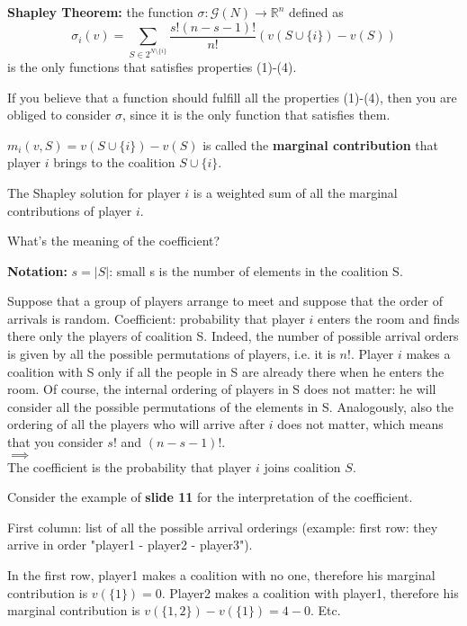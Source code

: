 \bigskip
\noindent \textbf{Shapley Theorem:} the function $\sigma: \mathcal{G}(N) \rightarrow \mathbb{R}^n$ defined as
\[
	\sigma_i(v) = \sum_{S \in 2^{N \setminus \{i\}}}{\frac{s!(n-s-1)!}{n!} \left(v(S \cup \{i\}) - v(S)\right)}
\]
is the only functions that satisfies properties (1)-(4).

\bigskip
\noindent If you believe that a function should fulfill all the properties (1)-(4), then you are obliged to consider $\sigma$, since it is the only 
function that satisfies them.

\bigskip
\noindent $m_i(v,S) = v(S \cup \{i\}) - v(S)$ is called the \textbf{marginal contribution} that
player $i$ brings to the coalition $S \cup \{i\}$.

\bigskip
\noindent The Shapley solution for player $i$ is a weighted sum of all the 
marginal contributions of player $i$. 

\bigskip
\noindent What's the meaning of the coefficient? 

\noindent \textbf{Notation:} $s = |S|$: small s is the number of elements in 
the coalition S.

\noindent Suppose that a group of players arrange to meet and suppose that 
the order of arrivals is random. Coefficient: probability that player $i$ 
enters the room and finds there only the players of coalition S. Indeed, the 
number of possible arrival orders is given by all the possible permutations of 
players, i.e. it is $n!$. Player $i$ makes a coalition with S only if all the 
people in S are already there when he enters the room. Of course, the internal 
ordering of players in S does not matter: he will consider all the possible 
permutations of the elements in S. Analogously, also the ordering of all the 
players who will arrive after $i$ does not matter, which means that you 
consider $s!$ and $(n-s-1)!$.\\
$\implies$\\
The coefficient is the probability that player $i$ joins coalition $S$.

\noindent Consider the example of \textbf{slide 11} for the interpretation of 
the coefficient.

\noindent First column: list of all the possible arrival orderings (example: 
first row: they arrive in order "player1 - player2 - player3").

\noindent In the first row, player1 makes a coalition with no one, therefore 
his marginal contribution is $v(\{1\}) = 0$. Player2 makes a coalition with 
player1, therefore his marginal contribution is $v(\{1,2\}) - v(\{1\}) = 4 - 0$. 
Etc.

